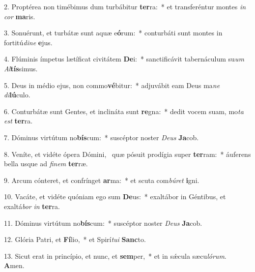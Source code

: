 2. Proptérea non timébimus dum turbábitur \textbf{ter}ra:~*  et transferéntur montes \textit{in} \textit{cor} \textbf{ma}ris.\

3. Sonuérunt, et turbátæ sunt aquæ e\textbf{ó}rum:~*  conturbáti sunt montes in fortitú\textit{di}\textit{ne} \textbf{e}jus.\

4. Flúminis ímpetus lætíficat civitátem \textbf{De}i:~*  sanctificávit tabernáculum su\textit{um} \textit{Al}\textbf{tís}simus.\

5. Deus in médio ejus, non commo\textbf{vé}bitur:~*  adjuvábit eam Deus ma\textit{ne} \textit{di}\textbf{lú}culo.\

6. Conturbátæ sunt Gentes, et inclináta sunt \textbf{re}gna:~*  dedit vocem suam, mo\textit{ta} \textit{est} \textbf{ter}ra.\

7. Dóminus virtútum no\textbf{bís}cum:~*  suscéptor noster \textit{De}\textit{us} \textbf{Ja}cob.\

8. Veníte, et vidéte ópera Dómini, \dag\  quæ pósuit prodígia super \textbf{ter}ram:~*  áuferens bella usque ad \textit{fi}\textit{nem} \textbf{ter}ræ.\

9. Arcum cónteret, et confrínget \textbf{ar}ma:~*  et scuta com\textit{bú}\textit{ret} \textbf{i}gni.\

10. Vacáte, et vidéte quóniam ego sum \textbf{De}us:~*  exaltábor in Géntibus, et exaltá\textit{bor} \textit{in} \textbf{ter}ra.\

11. Dóminus virtútum no\textbf{bís}cum:~*  suscéptor noster \textit{De}\textit{us} \textbf{Ja}cob.\

12. Glória Patri, et \textbf{Fí}lio,~*  et Spirí\textit{tu}\textit{i} \textbf{Sanc}to.\

13. Sicut erat in princípio, et nunc, et \textbf{sem}per,~*  et in sǽcula sæcu\textit{ló}\textit{rum}. \textbf{A}men.\

